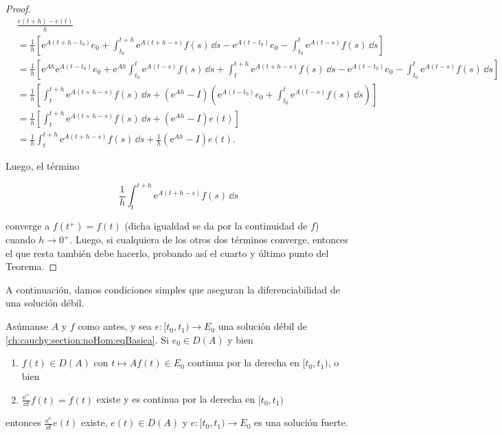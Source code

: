 \begin{proof}
    \begin{align*}
        &\frac{e(t+h) - e(t)}{h}\\
        &= \frac{1}{h} \left[ \mathrm{e}^{A(t+h-t_0)}e_0 + \int_{t_0}^{t+h}\mathrm{e}^{A(t+h-s)} f(s) \, \dd s - \mathrm{e}^{A(t-t_0)}e_0 - \int_{t_0}^{t}\mathrm{e}^{A(t-s)} f(s) \, \dd s \right]\\
        &= \frac{1}{h} \left[ \mathrm{e}^{Ah}\mathrm{e}^{A(t-t_0)}e_0 + \mathrm{e}^{Ah}\int_{t_0}^{t}\mathrm{e}^{A(t-s)} f(s) \, \dd s + \int_{t}^{t+h}\mathrm{e}^{A(t+h-s)} f(s) \, \dd s - \mathrm{e}^{A(t-t_0)}e_0 - \int_{t_0}^{t}\mathrm{e}^{A(t-s)} f(s) \, \dd s \right]\\
        &= \frac{1}{h}\left[\int_{t}^{t+h}\mathrm{e}^{A(t+h-s)} f(s) \, \dd s + (\mathrm{e}^{Ah} - I) \left( \mathrm{e}^{A(t-t_0)}e_0 + \int_{t_0}^{t}\mathrm{e}^{A(t-s)} f(s) \, \dd s \right) \right]\\
        &= \frac{1}{h} \left[\int_{t}^{t+h}\mathrm{e}^{A(t+h-s)} f(s) \, \dd s + (\mathrm{e}^{Ah} - I)e(t) \right]\\
        &= \frac{1}{h} \int_{t}^{t+h}\mathrm{e}^{A(t+h-s)} f(s) \, \dd s + \frac{1}{h}(\mathrm{e}^{Ah} - I)e(t).
    \end{align*}

    Luego, el término

    \[\frac{1}{h} \int_{t}^{t+h}\mathrm{e}^{A(t+h-s)} f(s) \, \dd s\]

    converge a $f(t^+) = f(t)$ (dicha igualdad se da por la continuidad de $f$) cuando $h \rightarrow 0^+$. Luego, si cualquiera de los otros dos términos converge, entonces el que resta también debe hacerlo, probando así el cuarto y último punto del Teorema.
\end{proof}

A continuación, damos condiciones simples que aseguran la diferenciabilidad de una solución débil.\\

\begin{Teorema}
    \label{ch:cauchy:section:noHom:th:conDiffSolDebil}

    Asúmanse $A$ y $f$ como antes, y sea $e : [t_0, t_1) \rightarrow E_0$ una solución débil de \eqref{ch:cauchy:section:noHom:eqBasica}. Si $e_0 \in D(A)$ y bien
    
    \begin{enumerate}
    \item $f(t) \in D(A)$ con $t \mapsto Af(t) \in E_0$ continua por la derecha en $[t_0, t_1)$, o bien

    \item $\displaystyle \frac{\dd^+}{\dd t}f(t) = \dot{f}(t)$ existe y es continua por la derecha en $[t_0, t_1)$
    \end{enumerate}

    entonces $\displaystyle \frac{\dd^+}{\dd t}e(t)$ existe, $e(t) \in D(A)$ y $e : [t_0, t_1) \rightarrow E_0$ es una solución fuerte.
\end{Teorema}

